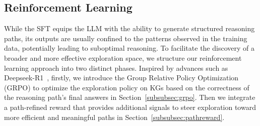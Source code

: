 \subsection{Reinforcement Learning}
\label{subsec:rl}
While the SFT equips the LLM with the ability to generate structured reasoning paths, 
its outputs are usually confined to the patterns observed in the training data,
potentially leading to suboptimal reasoning. 
To facilitate the discovery of a broader and more effective exploration space, we structure our reinforcement learning approach into two distinct phases.
Inspired by advances such as Deepseek-R1~\citep{deepseek-math}, 
firstly, we introduce the Group Relative Policy Optimization (GRPO) to optimize the exploration policy on KGs based on the correctness of the reasoning path's final answers in Section~\ref{subsubsec:grpo}.
Then we integrate a path-refined reward that provides additional signals to steer exploration toward more efficient and meaningful paths in Section~\ref{subsubsec:pathreward}.



